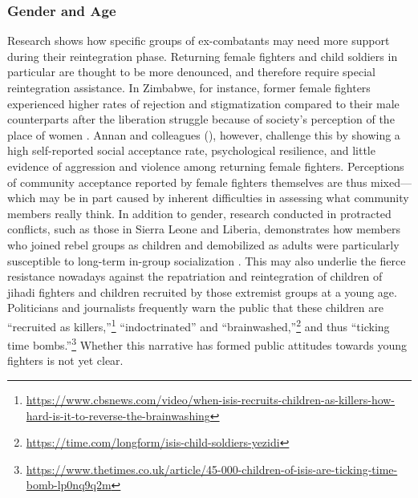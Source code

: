\subsubsection{Gender and Age}
Research shows how specific groups of ex-combatants may need more support during their reintegration phase. Returning female fighters and child soldiers in particular are thought to be more denounced, and therefore require special reintegration assistance. In Zimbabwe, for instance, former female fighters experienced higher rates of rejection and stigmatization compared to their male counterparts after the liberation struggle because of society's perception of the place of women \citep{Musemwa1995}. Annan and colleagues (\citeyear{Annan2011}), however, challenge this by showing a high self-reported social acceptance rate, psychological resilience, and little evidence of aggression and violence among returning female fighters. Perceptions of community acceptance reported by female fighters themselves are thus mixed---which may be in part caused by inherent difficulties in assessing what community members really think. In addition to gender, research conducted in protracted conflicts, such as those in Sierra Leone and Liberia, demonstrates how members who joined rebel groups as children and demobilized as adults were particularly susceptible to long-term in-group socialization \cite{Ozerdem2011}. This may also underlie the fierce resistance nowadays against the repatriation and reintegration of children of jihadi fighters and children recruited by those extremist groups at a young age. Politicians and journalists frequently warn the public that these children are ``recruited as killers,''\footnote{\url{https://www.cbsnews.com/video/when-isis-recruits-children-as-killers-how-hard-is-it-to-reverse-the-brainwashing}} ``indoctrinated'' and ``brainwashed,''\footnote{\url{https://time.com/longform/isis-child-soldiers-yezidi}} and thus ``ticking time bombs.''\footnote{\url{https://www.thetimes.co.uk/article/45-000-children-of-isis-are-ticking-time-bomb-lp0nq9q2m}} Whether this narrative has formed public attitudes towards young fighters is not yet clear. 

